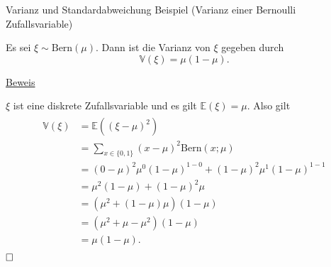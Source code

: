 \documentclass[
  8pt,
  ignorenonframetext,
]{beamer}
\begin{document}
\begin{frame}{Varianz und Standardabweichung}
\protect\hypertarget{varianz-und-standardabweichung-1}{}
Beispiel (Varianz einer Bernoulli Zufallsvariable) \small

Es sei \(\xi \sim \mbox{Bern}(\mu)\). Dann ist die Varianz von \(\xi\)
gegeben durch \begin{equation}
\mathbb{V}(\xi) = \mu(1-\mu).
\end{equation}

\footnotesize

\underline{Beweis} \vspace{1mm}

\(\xi\) ist eine diskrete Zufallsvariable und es gilt
\(\mathbb{E}(\xi) = \mu\). Also gilt \begin{align}
\begin{split}
\mathbb{V}(\xi)
& = \mathbb{E}\left((\xi - \mu)^2\right) \\
& = \sum_{x \in \{0,1\}} (x - \mu)^2 \mbox{Bern}(x;\mu) \\
& = (0 - \mu)^2 \mu^0(1-\mu)^{1-0}  + (1 - \mu)^2\mu^1(1-\mu)^{1-1}  \\
& = \mu^2 (1-\mu)  + (1 - \mu)^2\mu  \\
& = \left(\mu^2  + (1 - \mu)\mu\right)(1-\mu)  \\
& = \left(\mu^2 + \mu - \mu^2\right)(1 - \mu) \\
& = \mu(1-\mu).
\end{split}
\end{align} \(\hfill \Box\)
\end{frame}
\end{document}
